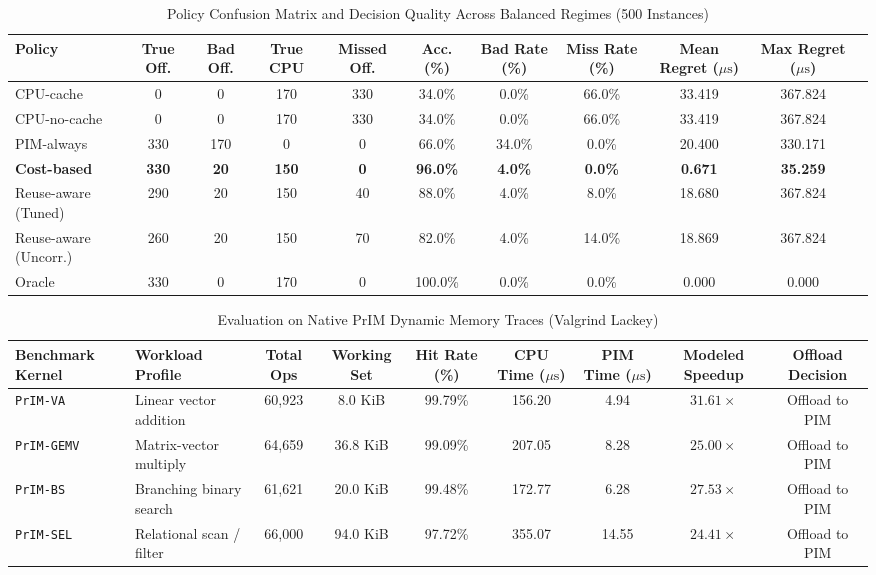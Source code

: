 \documentclass[journal,10pt,twocolumn]{IEEEtran}
\begin{document}
\begin{table}[t]
\caption{Policy Confusion Matrix and Decision Quality Across Balanced Regimes (500 Instances)}
\label{tab:confusion_matrix}
\centering
\begin{tabular}{lcccccccccc}
\toprule
\textbf{Policy} & \textbf{True Off.} & \textbf{Bad Off.} & \textbf{True CPU} & \textbf{Missed Off.} & \textbf{Acc. (\%)} & \textbf{Bad Rate (\%)} & \textbf{Miss Rate (\%)} & \textbf{Mean Regret ($\mu\text{s}$)} & \textbf{Max Regret ($\mu\text{s}$)} \\
\midrule
CPU-cache & 0 & 0 & 170 & 330 & 34.0\% & 0.0\% & 66.0\% & 33.419 & 367.824 \\
CPU-no-cache & 0 & 0 & 170 & 330 & 34.0\% & 0.0\% & 66.0\% & 33.419 & 367.824 \\
PIM-always & 330 & 170 & 0 & 0 & 66.0\% & 34.0\% & 0.0\% & 20.400 & 330.171 \\
\textbf{Cost-based} & \textbf{330} & \textbf{20} & \textbf{150} & \textbf{0} & \textbf{96.0\%} & \textbf{4.0\%} & \textbf{0.0\%} & \textbf{0.671} & \textbf{35.259} \\
Reuse-aware (Tuned) & 290 & 20 & 150 & 40 & 88.0\% & 4.0\% & 8.0\% & 18.680 & 367.824 \\
Reuse-aware (Uncorr.) & 260 & 20 & 150 & 70 & 82.0\% & 4.0\% & 14.0\% & 18.869 & 367.824 \\
Oracle & 330 & 0 & 170 & 0 & 100.0\% & 0.0\% & 0.0\% & 0.000 & 0.000 \\
\bottomrule
\end{tabular}
\end{table}

\begin{table}[t]
\caption{Evaluation on Native PrIM Dynamic Memory Traces (Valgrind Lackey)}
\label{tab:traces_native}
\centering
\begin{tabular}{llccccccc}
\toprule
\textbf{Benchmark Kernel} & \textbf{Workload Profile} & \textbf{Total Ops} & \textbf{Working Set} & \textbf{Hit Rate (\%)} & \textbf{CPU Time ($\mu\text{s}$)} & \textbf{PIM Time ($\mu\text{s}$)} & \textbf{Modeled Speedup} & \textbf{Offload Decision} \\
\midrule
\texttt{PrIM-VA} & Linear vector addition & 60,923 & 8.0 KiB & 99.79\% & 156.20 & 4.94 & $31.61\times$ & Offload to PIM \\
\texttt{PrIM-GEMV} & Matrix-vector multiply & 64,659 & 36.8 KiB & 99.09\% & 207.05 & 8.28 & $25.00\times$ & Offload to PIM \\
\texttt{PrIM-BS} & Branching binary search & 61,621 & 20.0 KiB & 99.48\% & 172.77 & 6.28 & $27.53\times$ & Offload to PIM \\
\texttt{PrIM-SEL} & Relational scan / filter & 66,000 & 94.0 KiB & 97.72\% & 355.07 & 14.55 & $24.41\times$ & Offload to PIM \\
\bottomrule
\end{tabular}
\end{table}
\end{document}
